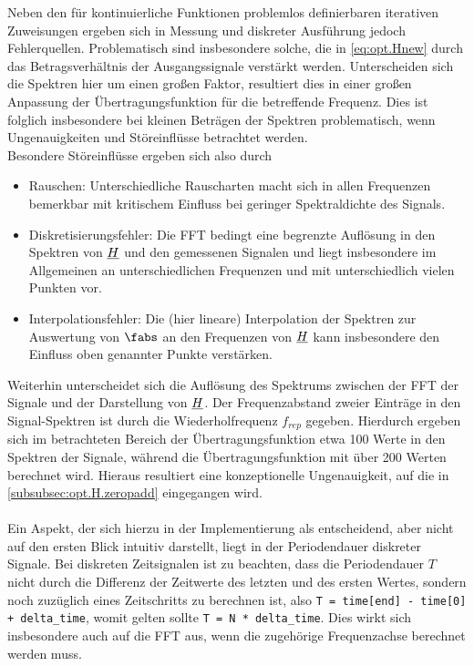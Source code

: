 \documentclass[../Report.tex]{subfiles}
\begin{document}
Neben den für kontinuierliche Funktionen problemlos definierbaren iterativen Zuweisungen ergeben sich in Messung und diskreter Ausführung jedoch Fehlerquellen. Problematisch sind insbesondere solche, die in \eqref{eq:opt.Hnew} durch das Betragsverhältnis der Ausgangssignale verstärkt werden. 
Unterscheiden sich die Spektren hier um einen großen Faktor, resultiert dies in einer großen Anpassung der Übertragungsfunktion für die betreffende Frequenz. Dies ist folglich insbesondere bei kleinen Beträgen der Spektren problematisch, wenn Ungenauigkeiten und Störeinflüsse betrachtet werden. 
\\
Besondere Störeinflüsse ergeben sich also durch
\begin{itemize}
	\item Rauschen: Unterschiedliche Rauscharten macht sich in allen Frequenzen bemerkbar mit kritischem Einfluss bei geringer Spektraldichte des Signals.\cite[S. 205 ff.]{lerch10}
	
	\item Diskretisierungsfehler: Die FFT bedingt eine begrenzte Auflösung in den Spektren von $\underline{H}$ und den gemessenen Signalen und liegt insbesondere im Allgemeinen an unterschiedlichen Frequenzen und mit unterschiedlich vielen Punkten vor.
	
	\item Interpolationsfehler: Die (hier lineare) Interpolation der Spektren zur Auswertung von $\fabs$ an den Frequenzen von $\underline{H}$ kann insbesondere den Einfluss oben genannter Punkte verstärken.
\end{itemize}

Weiterhin unterscheidet sich die Auflösung des Spektrums zwischen der FFT der Signale und der Darstellung von $\underline{H}$. Der Frequenzabstand zweier Einträge in den Signal-Spektren ist durch die Wiederholfrequenz $f_{rep}$ gegeben. Hierdurch ergeben sich im betrachteten Bereich der Übertragungsfunktion etwa 100 Werte in den Spektren der Signale, während die Übertragungsfunktion mit über 200 Werten berechnet wird. Hieraus resultiert eine konzeptionelle Ungenauigkeit, auf die in \ref{subsubsec:opt.H.zeropadd} eingegangen wird. 
\\
\\
Ein Aspekt, der sich hierzu in der Implementierung als entscheidend, aber nicht auf den ersten Blick intuitiv darstellt, liegt in der Periodendauer diskreter Signale. Bei diskreten Zeitsignalen ist zu beachten, dass die Periodendauer $T$ nicht durch die Differenz der Zeitwerte des letzten und des ersten Wertes, sondern noch zuzüglich eines Zeitschritts  zu berechnen ist, also \lstinline{T = time[end] - time[0] + delta_time}, womit gelten sollte \lstinline{T = N * delta_time}. Dies wirkt sich insbesondere auch auf die FFT aus, wenn die zugehörige Frequenzachse berechnet werden muss.
\end{document}
